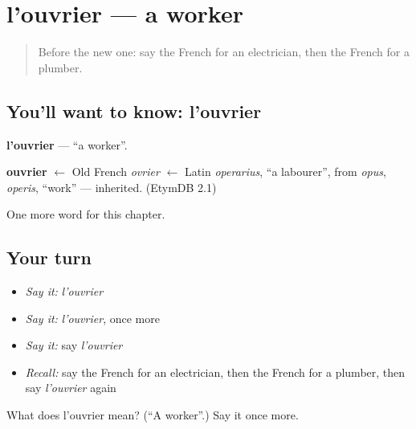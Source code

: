 \section[l'ouvrier]{l'ouvrier — a worker}

\label{lesson:FR-C196-ouvrier}



\begin{quote}
Before the new one: say the French for an electrician, then the French for a plumber.
\end{quote}

\subsection*{You'll want to know: l'ouvrier}
\textbf{l'ouvrier} — \textquotedblleft{}a worker\textquotedblright{}.

\begin{cousinweb}
\textbf{ouvrier} $\leftarrow$ Old French \emph{ovrier} $\leftarrow$ Latin \emph{operarius}, \textquotedblleft{}a labourer\textquotedblright{}, from \emph{opus}, \emph{operis}, \textquotedblleft{}work\textquotedblright{} — inherited. (EtymDB 2.1)
\end{cousinweb}

\begin{grammarlens}[title={What you've built}]
One more word for this chapter.
\end{grammarlens}

\subsection*{Your turn}
\begin{itemize}
\raggedright
  \item \emph{Say it:} \emph{l'ouvrier}
  \item \emph{Say it:} \emph{l'ouvrier}, once more
  \item \emph{Say it:} say \emph{l'ouvrier}
  \item \emph{Recall:} say the French for an electrician, then the French for a plumber, then say \emph{l'ouvrier} again
\end{itemize}

\begin{tcolorbox}[breakable,colback=teal!4,colframe=teal!35!black,title={Before you move on}]
What does l'ouvrier mean? (\textquotedblleft{}A worker\textquotedblright{}.) Say it once more.
\end{tcolorbox}
